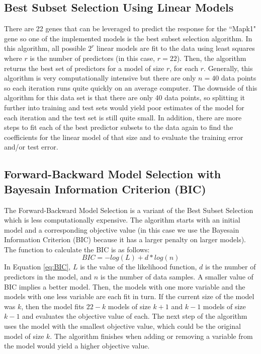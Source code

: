 \documentclass[letterpaper]{article}
\begin{document}
\subsection{Best Subset Selection Using Linear Models}
There are 22 genes that can be leveraged to predict the response for the ``Mapk1" gene so one of the implemented models is the best subset selection algorithm.  In this algorithm, all possible $2^r$ linear models are fit to the data using least squares where $r$ is the number of predictors (in this case, $r=22$).  Then, the algorithm returns the best set of predictors for a model of size $r$, for each $r$.  Generally, this algorithm is very computationally intensive but there are only $n=40$ data points so each iteration runs quite quickly on an average computer.  The downside of this algorithm for this data set is that there are only 40 data points, so splitting it further into training and test sets would yield poor estimates of the model for each iteration and the test set is still quite small.  In addition, there are more steps to fit each of the best predictor subsets to the data again to find the coefficients for the linear model of that size and to evaluate the training error and/or test error.

\subsection{Forward-Backward Model Selection with Bayesain Information Criterion (BIC)}
The Forward-Backward Model Selection is a variant of the Best Subset Selection which is less computationally expensive.  The algorithm starts with an initial model and a corresponding objective value (in this case we use the Bayesain Information Criterion (BIC) because it has a larger penalty on larger models).  The function to calculate the BIC is as follows:
\begin{equation}
BIC=-log(L)+d*log(n)
\label{eq:BIC}
\end{equation}
In Equation \ref{eq:BIC}, $L$ is the value of the likelihood function, $d$ is the number of predictors in the model, and $n$ is the number of data samples.  A smaller value of BIC implies a better model.  Then, the models with one more variable and the models with one less variable are each fit in turn.  If the current size of the model was $k$, then the model fits $22-k$ models of size $k+1$ and $k-1$ models of size $k-1$ and evaluates the objective value of each.  The next step of the algorithm uses the model with the smallest objective value, which could be the original model of size $k$.  The algorithm finishes when adding or removing a variable from the model would yield a higher objective value.
\end{document}
